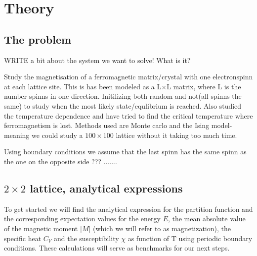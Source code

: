 \documentclass[../main.tex]{subfiles}
\begin{document}
\section{Theory}
\subsection{The problem}
WRITE a bit about the system we want to solve! What is it?

Study the magnetisation of a ferromagnetic matrix/crystal with one electronspinn at each lattice site. This is has been modeled as a L$\times$L matrix, where L is the number spinns in one direction. Initilizing both random and not(all spinns the same) to study when the most likely state/equlibrium is reached. Also studied the temperature dependence and have tried to find the critical temperature where ferromagnetism is lost.
Methods used are Monte carlo and the Ising model- meaning we could study a $100 \times 100$ lattice without it taking too much time.

Using boundary conditions we assume that the last spinn has the same spinn as the one on the opposite side ??? .......

\subsection{$2 \times 2$ lattice, analytical expressions} \label{sec:theory-analy}
To get started we will find the analytical expression for the partition function and the corresponding expectation values for the energy $E$, the mean absolute value of the magnetic moment $|M|$ (which we will refer to as magnetization), the specific heat $C_V$ and the susceptibility $\chi$ as function of T using periodic boundary conditions. These calculations will serve as benchmarks for our next steps.

\end{document}
